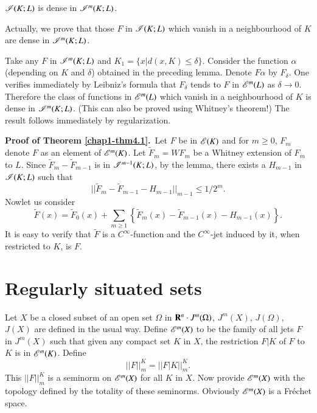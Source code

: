 \begin{lemma}\label{chap1-lem4.3}
$\mathscr{I}(K;L)$ is dense in $\mathscr{I}^{m}(K;L)$.
\end{lemma}

Actually, we prove that those $F$ in $\mathscr{I}(K;L)$ which vanish in a neighbourhood of $K$ are dense in $\mathscr{I}^{m}(K;L)$.

Take any $F$ in $\mathscr{I}^{m}(K;L)$ and $K_{1}=\{x|d(x,K)\leq \delta\}$. Consider the function $\alpha$ (depending on $K$ and $\delta$) obtained in the preceding lemma. Denote $F\alpha$ by $F_{\delta}$. One verifies immediately by Leibniz's formula that $F_{\delta}$ tends to $F$ in $\mathscr{E}^{m}(L)$ as $\delta\to 0$. Therefore the class of functions in $\mathscr{E}^{m}(L)$ which vanish in a neighbourhood of $K$ is dense in $\mathscr{I}^{m}(K;L)$. (This can also be proved using Whitney's theorem!) The result follows immediately by regularization.

\medskip
\noindent
{\bf Proof of Theorem \ref{chap1-thm4.1}.}~Let $F$ be in $\mathscr{E}(K)$ and for $m\geq 0$, $F_{m}$ denote $F$ as an element of $\mathscr{E}^{m}(K)$. Let $\widetilde{F}_{m}=WF_{m}$ be a Whitney extension of $F_{m}$ to $L$. Since $\widetilde{F}_{m}-\widetilde{F}_{m-1}$ is in $\mathscr{I}^{m-1}(K;L)$, by the lemma, there exists a $H_{m-1}$ in $\mathscr{I}(K;L)$ such that
$$
||\widetilde{F}_{m}-\widetilde{F}_{m-1}-H_{m-1}||_{m-1}\leq 1/2^{m}.
$$
Now\pageoriginale let us consider
$$
\widetilde{F}(x)=\widetilde{F}_{0}(x)+\sum\limits_{m\geq 1}\left\{\widetilde{F}_{m}(x)-\widetilde{F}_{m-1}(x)-H_{m-1}(x)\right\}.
$$
It is easy to verify that $\widetilde{F}$ is a $C^{\infty}$-function and the $C^{\infty}$-jet induced by it, when restricted to $K$, is $F$.

\section{Regularly situated sets}\label{chap1-sec5}

Let $X$ be a closed subset of an open set $\Omega$ in $\mathbf{R}^{n}\cdot J^{m}(\Omega)$, $J^{m}(X)$, $J(\Omega)$, $J(X)$ are defined in the usual way. Define $\mathscr{E}^{m}(X)$ to be the family of all jets $F$ in $J^{m}(X)$ such that given any compact set $K$ in $X$, the restriction $F|K$ of $F$ to $K$ is in $\mathscr{E}^{m}(K)$. Define
$$
||F||^{K}_{m}=||F|K||^{K}_{m}.
$$
This $||F||^{K}_{m}$ is a seminorm on $\mathscr{E}^{m}(X)$ for all $K$ in $X$. Now provide $\mathscr{E}^{m}(X)$ with the topology defined by the totality of these seminorms. Obviously $\mathscr{E}^{m}(X)$ is a Fr\'echet space.

